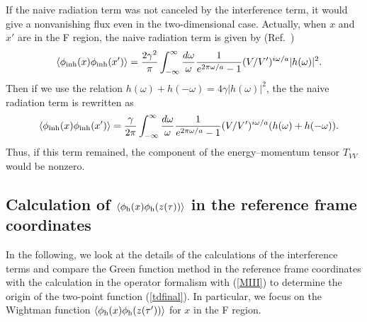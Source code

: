 \documentclass[aps,prd,preprintnumbers,nofootinbib,showpacs,11pt]{revtex4}%
\begin{document}
\begin{widetext}
If the naive radiation term was not canceled by the interference term,
it would give a nonvanishing flux even in the two-dimensional case. 
Actually, when $x$ and $x'$ are in the F region, the naive radiation term is given by 
(Ref.~\cite{HuRaval})
\begin{eqnarray}
&&\langle\phi_{\rm inh}(x)\phi_{\rm inh}(x')\rangle
={2\gamma^2\over \pi}\int_{-\infty}^{\infty}{d\omega\over \omega}{1\over e^{2\pi\omega/a}-1}
(V/V')^{i\omega/a}|h(\omega)|^2.
\end{eqnarray}
Then if we use the relation $h(\omega)+h(-\omega)=4\gamma|h(\omega)|^2$, the 
the naive radiation term is rewritten as
\begin{eqnarray}
&&\langle\phi_{\rm inh}(x)\phi_{\rm inh}(x')\rangle
={\gamma\over 2\pi}\int_{-\infty}^{\infty}{d\omega\over \omega}{1\over e^{2\pi\omega/a}-1}
(V/V')^{i\omega/a}(h(\omega)+h(-\omega)).
\label{pxpxvv}
\end{eqnarray}
Thus, if this term remained, the component of the energy--momentum tensor $T_{VV}$ would be
nonzero. 
\subsection{Calculation of $\langle\phi_{\rm h}(x)\phi_{\rm h}(z(\tau))\rangle$ 
in the reference frame coordinates
\label{Sec:2dimGreen}}
In the following, we look at the details of the calculations of the interference terms
and compare the Green function method in the reference frame coordinates 
with the calculation in the operator formalism with (\ref{MIII}) 
to determine the origin of the two-point function (\ref{tdfinal}). 
In particular, we focus on the Wightman function $\langle \phi_{\rm h}(x)\phi_{\rm h}(z(\tau'))\rangle$
for $x$ in the F region. 


\end{widetext}
\end{document}
